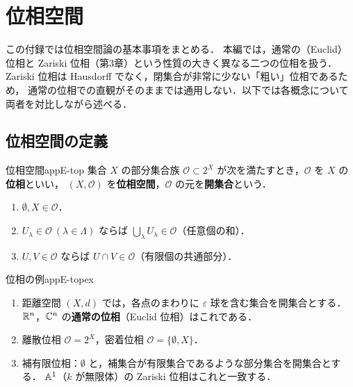 \chapter{位相空間}\label{app:E}

この付録では位相空間論の基本事項をまとめる．
本編では，通常の（Euclid）位相と Zariski 位相（第3章）という性質の大きく異なる二つの位相を扱う．
Zariski 位相は Hausdorff でなく，閉集合が非常に少ない「粗い」位相であるため，
通常の位相での直観がそのままでは通用しない．以下では各概念について両者を対比しながら述べる．

\section{位相空間の定義}

\begin{mydef}{位相空間}{appE-top}
集合 $X$ の部分集合族 $\mathcal O\subset2^X$ が次を満たすとき，$\mathcal O$ を $X$ の\textbf{位相}といい，
$(X,\mathcal O)$ を\textbf{位相空間}，$\mathcal O$ の元を\textbf{開集合}という．
\begin{enumerate}
\item $\emptyset,X\in\mathcal O$．
\item $U_\lambda\in\mathcal O\ (\lambda\in\Lambda)$ ならば $\bigcup_\lambda U_\lambda\in\mathcal O$（任意個の和）．
\item $U,V\in\mathcal O$ ならば $U\cap V\in\mathcal O$（有限個の共通部分）．
\end{enumerate}
\end{mydef}

\begin{myex}{位相の例}{appE-topex}
\begin{enumerate}
\item 距離空間 $(X,d)$ では，各点のまわりに $\varepsilon$ 球を含む集合を開集合とする．$\mathbb{R}^n$，$\mathbb{C}^n$ の\textbf{通常の位相}（Euclid 位相）はこれである．
\item 離散位相 $\mathcal O=2^X$，密着位相 $\mathcal O=\{\emptyset,X\}$．
\item 補有限位相：$\emptyset$ と，補集合が有限集合であるような部分集合を開集合とする．
$\mathbb{A}^1$（$k$ が無限体）の Zariski 位相はこれと一致する．
\end{enumerate}
\end{myex}

